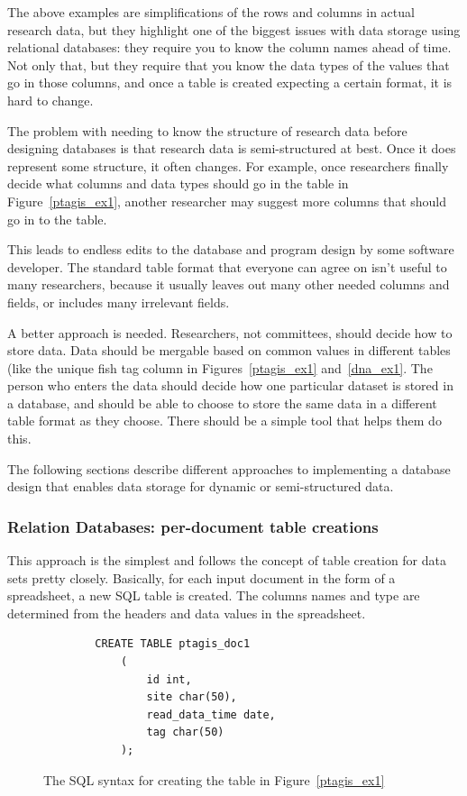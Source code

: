 The above examples are simplifications of the rows and columns in actual research 
data, but they highlight one of the biggest issues with data storage using relational
databases: they require you to know the column names ahead of time. Not only that,
but they require that you know the data types of the values that go in those columns,
and once a table is created expecting a certain format, it is hard to change.

The problem with needing to know the structure of research data before designing
databases is that research data is semi-structured at best. Once it does
represent some structure, it often changes. For example, once researchers finally 
decide what columns and data types should go in the table in Figure~\ref{ptagis_ex1},
another researcher may suggest more columns that should go in to the table.

This leads to endless edits to the database and program design by some software 
developer. The standard table format that everyone can agree on isn't useful to many
researchers, because it usually leaves out many other needed columns and fields,
or includes many irrelevant fields.

A better approach is needed. Researchers, not committees, should decide how to store 
data. Data should be mergable based on common values in different tables (like the 
unique fish tag column in Figures~\ref{ptagis_ex1} and~\ref{dna_ex1}. The 
person who enters the data should decide how one particular dataset is stored in a 
database, and should be able to choose to store the same data in a different table 
format as they choose. There should be a simple tool that helps them do this.

The following sections describe different approaches to implementing a database design
that enables data storage for dynamic or semi-structured data.


\subsubsection{Relation Databases: per-document table creations}
This approach is the simplest and follows the concept of table creation for data sets
pretty closely. Basically, for each input document in the form of a spreadsheet, a new
SQL table is created. The columns names and type are determined from the headers and 
data values in the spreadsheet.

\begin{figure}[h]
	\begin{center}
	\begin{lstlisting}
		CREATE TABLE ptagis_doc1
			(
				id int, 
				site char(50), 
				read_data_time date,
				tag char(50)
			); 
	\end{lstlisting}
	\caption{The SQL syntax for creating the table in Figure~\ref{ptagis_ex1} } 
	\label{ptagis_ex1_sql}
	\end{center}
\end{figure}

